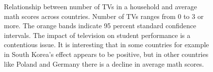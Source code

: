 \documentclass[
  11pt,
  a4paper,
]{article}
\begin{document}
\begin{figure}[H]


\caption{\label{fig-tvplot}Relationship between number of TVs in a
household and average math scores across countries. Number of TVs ranges
from 0 to 3 or more. The orange bands indicate 95 percent standard
confidence intervals. The impact of television on student performance is
a contentious issue. It is interesting that in some countries for
example in South Korea's effect appears to be positive, but in other
countries like Poland and Germany there is a decline in average math
scores.}

\end{figure}%
\end{document}
